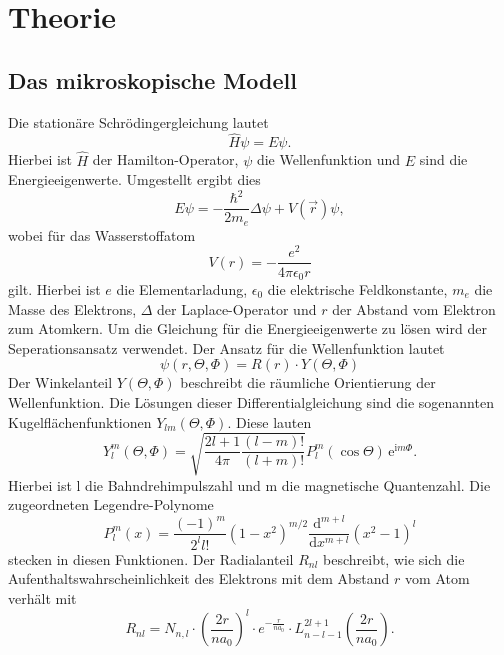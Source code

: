 \section{Theorie}
\label{sec:Theorie}

\subsection{Das mikroskopische Modell}
Die stationäre Schrödingergleichung lautet 
\begin{equation*}
    \hat{H} \psi = E \psi.
\end{equation*}
Hierbei ist $\hat{H}$ der Hamilton-Operator, $\psi$ die Wellenfunktion und $E$ sind die Energieeigenwerte.
Umgestellt ergibt dies
\begin{equation*}
    E \psi = -\frac{\hbar^2}{2m_e} \Delta \psi + V(\vec{r}) \psi,
\end{equation*}
wobei für das Wasserstoffatom 
\begin{equation*}
    V(r) = -\frac{e^2}{4 \pi \epsilon_0 r}
\end{equation*}
gilt. 
Hierbei ist $e$ die Elementarladung, $\epsilon_0$ die elektrische Feldkonstante, $m_e$ die Masse des Elektrons, $\Delta$ der Laplace-Operator und $r$ der Abstand vom Elektron zum Atomkern. 
Um die Gleichung für die Energieeigenwerte zu lösen wird der Seperationsansatz verwendet. 
Der Ansatz für die Wellenfunktion lautet
\begin{equation*}
     \psi(r, \Theta, \Phi) = R(r) \cdot Y(\Theta, \Phi) 
\end{equation*}
Der Winkelanteil $Y(\Theta, \Phi)$ beschreibt die räumliche Orientierung der Wellenfunktion. 
Die Lösungen dieser Differentialgleichung sind die sogenannten Kugelflächenfunktionen $Y_{lm}(\Theta, \Phi)$. 
Diese lauten 
\begin{equation*}
    Y_l^m(\Theta, \Phi) = \sqrt{\frac{2l + 1}{4\pi} \frac{(l - m)!}{(l + m)!}} P_l^m(\cos \Theta) \, \mathrm{e}^{\mathrm{i}m\Phi} .
\end{equation*}
Hierbei ist l die Bahndrehimpulszahl und m die magnetische Quantenzahl. 
Die zugeordneten Legendre-Polynome
\begin{equation*}
    P_l^m(x) = \frac{(-1)^m}{2^l l!} (1 - x^2)^{m/2} \frac{\mathrm{d}^{m+l}}{\mathrm{d}x^{m+l}} (x^2 - 1)^l
\end{equation*}
stecken in diesen Funktionen.
Der Radialanteil $R_{nl}$ beschreibt, wie sich die Aufenthaltswahrscheinlichkeit des Elektrons mit dem Abstand $r$ vom Atom verhält mit 
\begin{equation*}
R_{nl} = N_{n,l} \cdot \left( \frac{2r}{na_0} \right)^l \cdot e^{-\frac{r}{na_0}} \cdot L_{n-l-1}^{2l+1} \left( \frac{2r}{na_0} \right).
\end{equation*}
